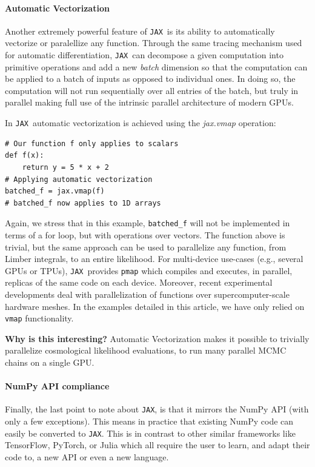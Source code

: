 \documentclass[twocolumn,twocolappendix,nofootinbib,iop]{openjournal}
\newcommand{\jax}{\texttt{JAX}}
\begin{document}
\paragraph{\textbf{Automatic Vectorization}} Another extremely powerful feature of \jax\ is its ability to automatically vectorize or paralellize any function. Through the same tracing mechanism used for automatic differentiation, \jax\ can decompose a given computation into primitive operations and add a new \textit{batch} dimension so that the computation can be applied to a batch of inputs as opposed to individual ones. In doing so, the computation will not run sequentially over all entries of the batch, but truly in parallel making full use of the intrinsic parallel architecture of modern GPUs.

In \jax\ automatic vectorization is achieved using the \textit{jax.vmap} operation:
\begin{lstlisting}[language=iPython]
# Our function f only applies to scalars
def f(x):
	return y = 5 * x + 2
# Applying automatic vectorization
batched_f = jax.vmap(f)
# batched_f now applies to 1D arrays
\end{lstlisting}
Again, we stress that in this example, \texttt{batched\_f} will not be implemented in terms of a for loop, but with operations over vectors. The function above is trivial, but the same approach can be used to parallelize any function, from Limber integrals, to an entire likelihood. For multi-device use-cases (e.g., several GPUs or TPUs), \jax\ provides \texttt{pmap} which compiles and executes, in parallel, replicas of the same code on each device. Moreover, recent experimental developments deal with parallelization of functions over supercomputer-scale hardware meshes. In the examples detailed in this article, we have only relied on \texttt{vmap} functionality.

\textbf{Why is this interesting?} Automatic Vectorization makes it possible to trivially parallelize cosmological likelihood evaluations, to run many parallel MCMC chains on a single GPU.

\paragraph{\textbf{NumPy API compliance}} Finally, the last point to note about \jax, is that it mirrors the NumPy API (with only a few exceptions). This means in practice that existing NumPy code can easily be converted to \jax. This is in contrast to other similar frameworks like TensorFlow, PyTorch, or Julia which all require the user to learn, and adapt their code to, a new API or even a new language. 
\end{document}
